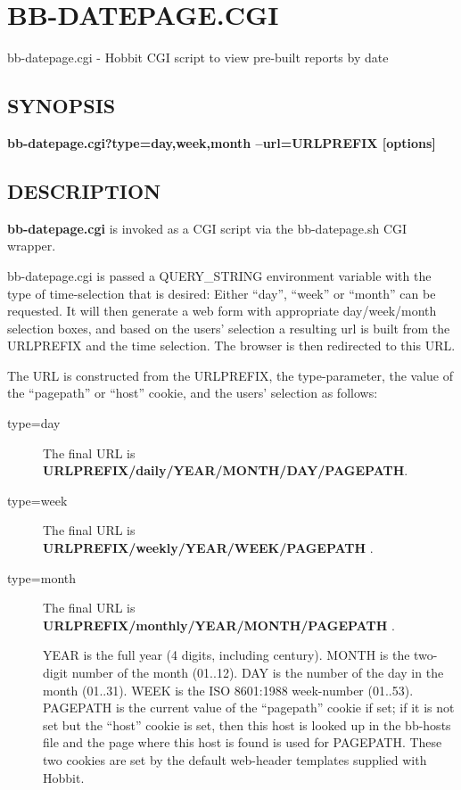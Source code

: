\newpage
\section{BB-DATEPAGE.CGI}

 bb-datepage.cgi - Hobbit CGI script to view pre-built reports by date \

\subsection{SYNOPSIS}

\textbf{bb-datepage.cgi?type={day,week,month} --url=URLPREFIX [options]}


 
\subsection{DESCRIPTION}
\textbf{bb-datepage.cgi}
 is invoked as a CGI script via the bb-datepage.sh CGI wrapper. 

  bb-datepage.cgi is passed a QUERY\_STRING environment variable with
  the type of time-selection that is desired: Either ``day'', ``week''
  or ``month'' can be requested. It will then generate a web form with
  appropriate day/week/month selection boxes, and based on the users'
  selection a resulting url is built from the URLPREFIX and the time
  selection. The browser is then redirected to this URL. 



  The URL is constructed from the URLPREFIX, the type-parameter, the
  value of the ``pagepath'' or ``host'' cookie, and the users'
  selection as follows: 



 \begin{description}
\item[type=day] The final URL is \textbf{URLPREFIX/daily/YEAR/MONTH/DAY/PAGEPATH}. 

 

\item[type=week] The final URL is \textbf{URLPREFIX/weekly/YEAR/WEEK/PAGEPATH}
. 

 

\item[type=month] The final URL is \textbf{URLPREFIX/monthly/YEAR/MONTH/PAGEPATH}
. 

  YEAR is the full year (4 digits, including century). MONTH is the
  two-digit number of the month (01..12). DAY is the number of the day
  in the month (01..31). WEEK is the ISO 8601:1988 week-number
  (01..53). PAGEPATH is the current value of the ``pagepath'' cookie
  if set; if it is not set but the ``host'' cookie is set, then this
  host is looked up in the bb-hosts file and the page where this host
  is found is used for PAGEPATH. These two cookies are set by the
  default web-header templates supplied with Hobbit. 



\end{description}

